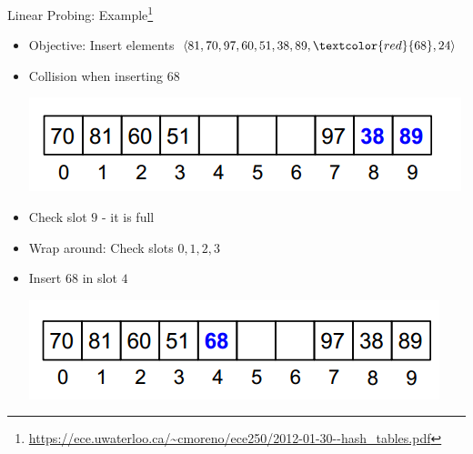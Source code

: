 \documentclass{beamer}
\begin{document}
\begin{frame}{Linear Probing: Example\footnote{\url{https://ece.uwaterloo.ca/~cmoreno/ece250/2012-01-30--hash_tables.pdf}}}
    \begin{itemize}
        \item Objective: Insert elements $\langle 81, 70, 97, 60, 51, 38, 89, \textcolor{red}{68}, 24 \rangle$ 
        \item Collision when inserting $68$ 
        \begin{center}
            \includegraphics[scale=0.5]{linearProbing5.png} \pause
        \end{center}
        \item Check slot $9$ - it is full \pause
        \item Wrap around: Check slots $0, 1, 2, 3$
        \item Insert $68$ in slot $4$
        \begin{center}
            \includegraphics[scale=0.5]{linearProbing6.png}
        \end{center}
    \end{itemize}
\end{frame}
\end{document}
